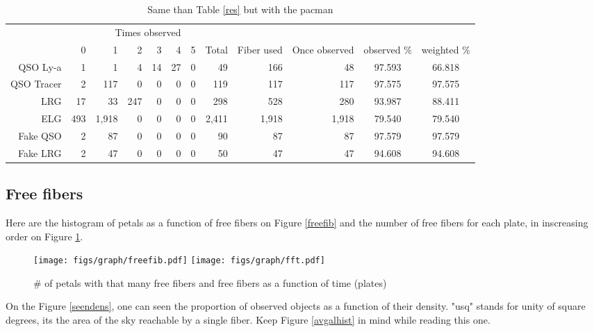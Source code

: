 \documentclass{article}
\begin{document}
\begin{table}[H]\begin{center}
\begin{tabular}{rrrrrrrrrrcc}
\hline
\multicolumn{6}{r}{Times observed} \\
	~ &           0 &     1 &  2 & 3 & 4 & 5 &  Total & Fiber used & Once observed & observed $\%$ & weighted $\%$ \\ \hline
   QSO Ly-a   &     1 &     1 &   4 & 14 & 27 & 0 &    49 &   166 &    48 & 97.593 & 66.818 \\ 
 QSO Tracer   &     2 &   117 &   0 &  0 &  0 & 0 &   119 &   117 &   117 & 97.575 & 97.575 \\ 
        LRG   &    17 &    33 & 247 &  0 &  0 & 0 &   298 &   528 &   280 & 93.987 & 88.411 \\ 
        ELG   &   493 & 1,918 &   0 &  0 &  0 & 0 & 2,411 & 1,918 & 1,918 & 79.540 & 79.540 \\ 
   Fake QSO   &     2 &    87 &   0 &  0 &  0 & 0 &    90 &    87 &    87 & 97.579 & 97.579 \\ 
   Fake LRG   &     2 &    47 &   0 &  0 &  0 & 0 &    50 &    47 &    47 & 94.608 & 94.608 \\ 

\hline
\end{tabular}
\caption{Same than Table \ref{res} but with the pacman}\label{pac}
\end{center}\end{table}


\subsection{Free fibers}
Here are the histogram of petals as a function of free fibers on Figure \ref{freefib} and the number of free fibers for each plate, in inscreasing order on Figure \ref{fft}.

\begin{figure}[H]\begin{center}
	\texttt{[image: figs/graph/freefib.pdf]}
	\texttt{[image: figs/graph/fft.pdf]}\hfill
	\caption{\# of petals with that many free fibers and free fibers as a function of time (plates)}\label{fft}
\end{center}\end{figure}

On the Figure \ref{seendens}, one can seen the proportion of observed objects as a function of their density. "usq" stands for unity of square degrees, its the area of the sky reachable by a single fiber. Keep Figure \ref{avgalhist} in mind while reading this one.
\end{document}

